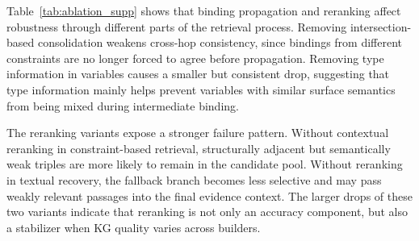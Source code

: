 \documentclass{article}
\theoremstyle{plain}
\theoremstyle{definition}
\theoremstyle{remark}
\begin{document}
Table~\ref{tab:ablation_supp} shows that binding propagation and reranking affect robustness through different parts of the retrieval process. Removing intersection-based consolidation weakens cross-hop consistency, since bindings from different constraints are no longer forced to agree before propagation. Removing type information in variables causes a smaller but consistent drop, suggesting that type information mainly helps prevent variables with similar surface semantics from being mixed during intermediate binding.

The reranking variants expose a stronger failure pattern. Without contextual reranking in constraint-based retrieval, structurally adjacent but semantically weak triples are more likely to remain in the candidate pool. Without reranking in textual recovery, the fallback branch becomes less selective and may pass weakly relevant passages into the final evidence context. The larger drops of these two variants indicate that reranking is not only an accuracy component, but also a stabilizer when KG quality varies across builders.


\end{document}
